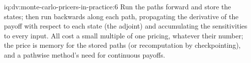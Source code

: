 \begin{solution}{iq:dv:monte-carlo-pricers-in-practice:6}
Run the paths forward and store the states; then run backwards along each path, propagating the derivative of the payoff with respect to each state (the
adjoint) and accumulating the sensitivities to every input. All  cost a small multiple of one pricing, whatever their number; the price is memory for
the stored paths (or recomputation by checkpointing), and a pathwise method's need for continuous payoffs.
\end{solution}
